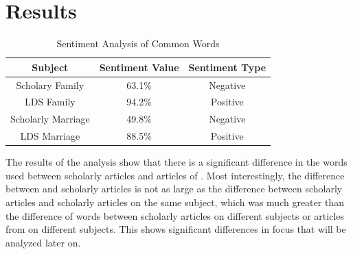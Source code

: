 \documentclass[twocolumn]{article}
\begin{document}
\section{Results}
\begin{table}[h] %
    \centering
    \caption{Sentiment Analysis of Common Words}
    \label{tab:example}
    \begin{tabular}{|c|c|c|} %
        \hline
        \textbf{Subject}   & \textbf{Sentiment Value} & \textbf{Sentiment Type} \\ %
        \hline
        Scholary Family    & 63.1\%                   & Negative                \\ %
        \hline

        LDS Family         & 94.2\%                   & Positive                \\ %
        \hline

        Scholarly Marriage & 49.8\%                   & Negative                \\ %
        \hline

        LDS Marriage       & 88.5\%                   & Positive                \\ %

        \hline
    \end{tabular}
\end{table}

The results of the analysis show that there is a significant difference in the words used between scholarly articles and articles of \church. Most interestingly, the difference between \church and scholarly articles is not as large as the difference between scholarly articles and scholarly articles on the same subject, which was much greater than the difference of words between scholarly articles on different subjects or articles from \church on different subjects. This shows significant differences in focus that will be analyzed later on.
\end{document}
